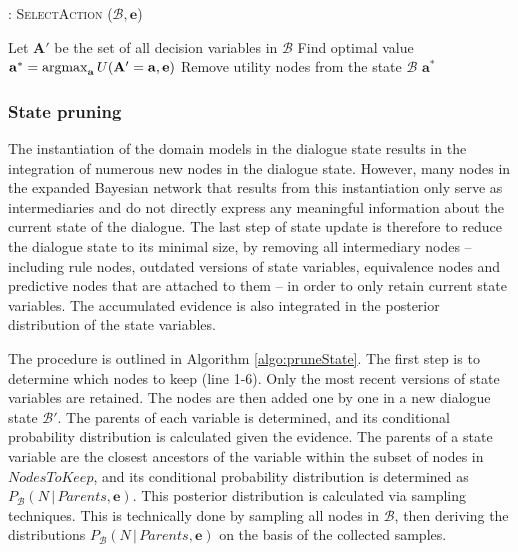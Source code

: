 \begin{algorithm}[h]
\caption{: \textsc{SelectAction} ($\mathcal{B}, \mathbf{e}$)}
\begin{algorithmic}[1] \vspace{1mm}
\STATE Let $\mathbf{A}'$ be the set of all decision variables in $\mathcal{B}$
\STATE Find optimal value $\mathbf{a}^* = \argmax_{\mathbf{a}} U(\mathbf{A}' = \mathbf{a}, \mathbf{e})$
\STATE Remove utility nodes from the state $\mathcal{B}$
\RETURN $\mathbf{a}^*$
\end{algorithmic}
\label{algo:actionselection}
\end{algorithm}


\subsubsection*{State pruning}

The instantiation of the domain models in the dialogue state results in the integration of numerous new nodes in the dialogue state. However, many nodes in the expanded Bayesian network that results from this instantiation only serve as intermediaries and do not directly express any meaningful information about the current state of the dialogue. The last step of state update is therefore to reduce the dialogue state to its minimal size, by removing all intermediary nodes -- including rule nodes, outdated versions of state variables, equivalence nodes and predictive nodes that are attached to them -- in order to only retain current state variables. The accumulated evidence is also integrated in the posterior distribution of the state variables.

The procedure is outlined in Algorithm \ref{algo:pruneState}. The first step is to determine which nodes to keep (line 1-6).  Only the most recent versions of state variables are retained. 
The nodes are then added one by one in a new dialogue state $\mathcal{B}'$.  The parents of each variable is determined, and its conditional probability distribution is calculated given the evidence.  The parents of a state variable are the closest ancestors of the variable within the subset of nodes in $\mathit{NodesToKeep}$, and its conditional probability distribution is determined as $P_{\mathcal{B}}(N \, | \, \mathit{Parents}, \mathbf{e})$.  This posterior distribution is calculated via sampling techniques. This is technically done by sampling all nodes in $\mathcal{B}$, then deriving the distributions $P_{\mathcal{B}}(N \, | \, \mathit{Parents}, \mathbf{e})$ on the basis of the collected samples. 


